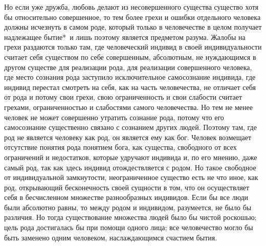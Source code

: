 \documentclass[12pt,oneside]{book}
\begin{document}
Но если уже дружба, любовь делают из несовершенного существа существо хотя бы относительно совершенное, то тем более грехи и ошибки отдельного человека должны исчезнуть в самом роде, который только в человечестве в целом получает надлежащее бытие*\let\svthefootnote\thefootnote\let\thefootnote\relax{}\let\thefootnote\svthefootnote~и лишь поэтому является предметом разума. Жалобы на грехи раздаются только там, где человеческий индивид в своей индивидуальности считает себя существом по себе совершенным, абсолютным, не нуждающимся в другом существе для реализации рода, для реализации совершенного человека, где место сознания рода заступило исключительное самосознание индивида, где индивид перестал смотреть на себя, как на часть человечества, не отличает себя от рода и потому свои грехи, свою ограниченность и свои слабости считает грехами, ограниченностью и слабостями самого человечества. Но тем не менее человек не может совершенно утратить сознание рода, потому что его самосознание существенно связано с сознанием других людей. Поэтому там, где род не является человеку как род, он является ему как бог. Человек возмещает отсутствие понятия рода понятием бога, как существа, свободного от всех ограничений и недостатков, которые удручают индивида и, по его мнению, даже самый род, так как здесь индивид отождествляется с родом. Но такое свободное от индивидуальной замкнутости, неограниченное существо есть не что иное, как род, открывающий бесконечность своей сущности в том, что он осуществляет себя в бесчисленном множестве разнообразных индивидов. Если бы все люди были абсолютно равны, то между родом и индивидом, разумеется, не было бы различия. Но тогда существование множества людей было бы чистой роскошью; цель рода достигалась бы при помощи одного лица; все человечество могло бы быть заменено одним человеком, наслаждающимся счастием бытия.
\end{document}
